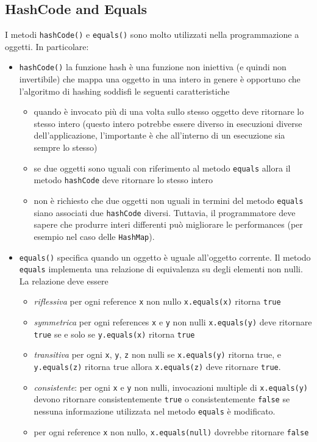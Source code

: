 \documentclass{article}
\begin{document}
\subsection{HashCode and Equals}
I metodi \texttt{hashCode()} e \texttt{equals()} sono molto utilizzati nella programmazione a oggetti. In particolare:
\begin{itemize}
\item \texttt{hashCode()} la funzione hash \`e una funzione non iniettiva (e quindi non invertibile) che mappa una oggetto in una intero in genere \`e opportuno che l'algoritmo di hashing soddisfi le seguenti caratteristiche
\begin{itemize}
\item quando \`e invocato pi\`u di una volta sullo stesso oggetto deve ritornare lo stesso intero (questo intero potrebbe essere diverso in esecuzioni diverse dell'applicazione, l'importante \`e che all'interno di un esecuzione sia sempre lo stesso)
\item se due oggetti sono uguali con riferimento al metodo \texttt{equals} allora  il metodo \texttt{hashCode} deve ritornare lo stesso intero
\item non \`e richiesto che due oggetti non uguali in termini del metodo \texttt{equals} siano associati due \texttt{hashCode} diversi. Tuttavia, il programmatore deve sapere che produrre interi differenti pu\`o migliorare le performances (per esempio nel caso delle \texttt{HashMap}).
\end{itemize}
\item \texttt{equals()} specifica quando un oggetto \`e uguale all'oggetto corrente. Il metodo \texttt{equals} implementa una relazione di equivalenza su degli elementi non nulli. La relazione deve essere
\begin{itemize}
\item \emph{riflessiva} per ogni reference \texttt{x} non nullo \texttt{x.equals(x)} ritorna \texttt{true}
\item \emph{symmetrica} per ogni references \texttt{x} e \texttt{y} non nulli \texttt{x.equals(y)} deve ritornare \texttt{true} se e solo se \texttt{y.equals(x)} ritorna \texttt{true}
\item \emph{transitiva} per ogni \texttt{x}, \texttt{y}, \texttt{z} non nulli se \texttt{x.equals(y)} ritorna true, e \texttt{y.equals(z)} ritorna true allora \texttt{x.equals(z)} deve ritornare \texttt{true}.
\item \emph{consistente}: per ogni \texttt{x} e \texttt{y} non nulli, invocazioni multiple di \texttt{x.equals(y)} devono ritornare consistentemente \texttt{true} o consistentemente \texttt{false} se nessuna informazione utilizzata nel metodo \texttt{equals} \`e modificato.
\item per ogni reference \texttt{x} non nullo, \texttt{x.equals(null)} dovrebbe ritornare \texttt{false}
\end{itemize}
\end{itemize}
\end{document}
